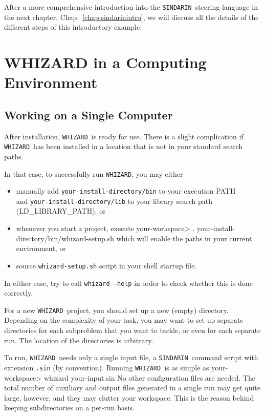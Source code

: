 \documentclass[12pt]{book}
\newenvironment{interaction}%
  {\begingroup\small
   \Verbatim}%
  {\endVerbatim
   \endgroup\noindent}
\newcommand{\ttt}[1]{\texttt{#1}}
\newcommand{\whizard}{\ttt{WHIZARD}}
\newcommand{\sindarin}{\ttt{SINDARIN}}
\begin{document}
After a more comprehensive introduction into the \sindarin\ steering
language in the next chapter, Chap.~\ref{chap:sindarinintro}, we will
discuss all the details of the different steps of this introductory
example.


\clearpage

\section{WHIZARD in a Computing Environment}

\subsection{Working on a Single Computer}
\label{sec:workspace}

After installation, \whizard\ is ready for use.  There is a slight
complication if \whizard\ has been installed in a location that is not
in your standard search paths.

In that case, to successfully run \whizard, you may either
\begin{itemize}
\item
  manually add \ttt{your-install-directory/bin} to your execution PATH\\
  and \ttt{your-install-directory/lib} to your library search path
  (LD\_LIBRARY\_PATH), or
\item
  whenever you start a project, execute
  \begin{interaction}
    your-workspace> . your-install-directory/bin/whizard-setup.sh
  \end{interaction}
  which will enable the paths in your current environment, or
\item
  source \ttt{whizard-setup.sh} script in your shell startup file.
\end{itemize}
In either case, try to call \ttt{whizard --help} in order to check
whether this is done correctly.

For a new \whizard\ project, you should set up a new (empty)
directory.  Depending on the complexity of your task, you may want to
set up separate directories for each subproblem that you want to
tackle, or even for each separate run.  The location of the
directories is arbitrary.

To run, \whizard\ needs only a single input file, a \sindarin\ command
script with extension \ttt{.sin} (by convention).  Running
\whizard\ is as simple as
\begin{interaction}
  your-workspace> whizard your-input.sin
\end{interaction}
No other configuration files are needed.  The total number of
auxiliary and output files generated in a single run may get quite
large, however, and they may clutter your workspace.  This is the
reason behind keeping subdirectories on a per-run basis.
\end{document}
